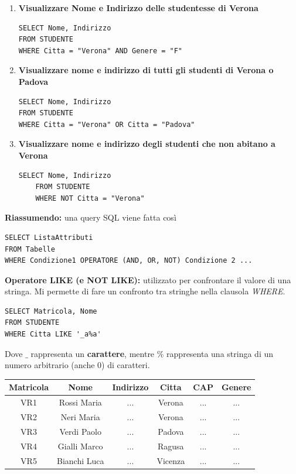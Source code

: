 \documentclass{article}
\begin{document}
\begin{enumerate}
WHERE Nome att OPERATORE valore

Predicati combinati mediante gli operatori AND OR NOT

\item \textbf{Visualizzare Nome e Indirizzo delle studentesse di Verona}
	\begin{lstlisting}[style=sqlstyle]
SELECT Nome, Indirizzo
FROM STUDENTE
WHERE Citta = "Verona" AND Genere = "F"
\end{lstlisting} 

\item \textbf{Visualizzare nome e indirizzo di tutti gli studenti di Verona o Padova}
	\begin{lstlisting}[style=sqlstyle]
SELECT Nome, Indirizzo
FROM STUDENTE
WHERE Citta = "Verona" OR Citta = "Padova"
\end{lstlisting} 

\item \textbf{Visualizzare nome e indirizzo degli studenti che non abitano a Verona}
	\begin{lstlisting}[style=sqlstyle]
	SELECT Nome, Indirizzo
	FROM STUDENTE
	WHERE NOT Citta = "Verona"
\end{lstlisting} 
\end{enumerate}

\textbf{Riassumendo:} una query SQL viene fatta così
\begin{lstlisting}[style=sqlstyle]
SELECT ListaAttributi
FROM Tabelle
WHERE Condizione1 OPERATORE (AND, OR, NOT) Condizione 2 ...
\end{lstlisting}

\textbf{Operatore LIKE (e NOT LIKE):} utilizzato per confrontare il valore di una stringa. Mi permette di fare un confronto tra stringhe nella clausola \textit{WHERE}.

\begin{lstlisting}[style=sqlstyle]
SELECT Matricola, Nome
FROM STUDENTE
WHERE Citta LIKE '_a%a'
\end{lstlisting}

Dove $\_$ rappresenta un \textbf{carattere}, mentre $\%$ rappresenta una stringa di un numero arbitrario (anche 0) di caratteri.

\begin{table}[h!]
	\begin{tabular}{|c|c|c|c|c|c|}
		\hline
		\textbf{Matricola} & \textbf{Nome} & \textbf{Indirizzo} & \textbf{Citta} & \textbf{CAP} & \textbf{Genere} \\
		\hline
		VR1 & Rossi Maria & ... & Verona & ... & ... \\
		\hline
		VR2 & Neri Maria & ... & Verona & ... & ... \\
		\hline
		VR3 & Verdi Paolo & ... & Padova & ... & ... \\
		\hline
		VR4 & Gialli Marco & ... & Ragusa & ... & ... \\
		\hline
		VR5 & Bianchi Luca & ... & Vicenza & ... & ... \\
		\hline
	\end{tabular}
\end{table}
\end{document}
